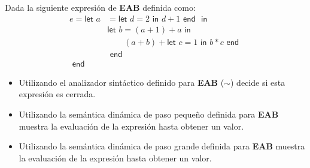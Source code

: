     \begin{exercise}
        Dada la siguiente expresión de \textbf{EAB} definida como:
        \begin{align*}
        	e = \textsf{let  }
        		a&= \textsf{let }d = 2 \textsf{ in } d+1 \textsf{ end }
        		\textsf{ in }\\
        		 &\textsf{let }b=(a + 1)+a 
        		 	\textsf{ in } \\
        		 & \qquad(a + b) + \textsf{let }c=1 \textsf{ in } 
        		 						b \ast c 
        		 				\textsf{ end }\\
        		 &\textsf{ end }\\
        	\textsf{ end }&
        \end{align*}

        \begin{itemize}
            \item Utilizando el analizador sintáctico definido para \textbf{EAB} ($\sim$) decide si esta expresión es cerrada.\\
            \item Utilizando la semántica dinámica de paso pequeño definida para \textbf{EAB} muestra la evaluación de la expresión hasta obtener un valor.\\
            \item Utilizando la semántica dinámica de paso grande definida para \textbf{EAB} muestra la evaluación de la expresión hasta obtener un valor.
        \end{itemize}
    \end{exercise}